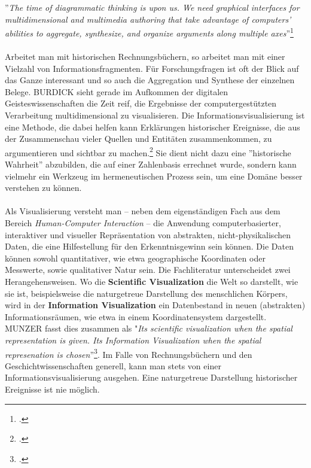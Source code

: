 \documentclass[12pt,a4paper]{article}
\begin{document}
''\textit{The time of diagrammatic thinking is upon us. We need graphical interfaces for multidimensional and multimedia authoring that take advantage of computers’ abilities to aggregate, synthesize, and organize arguments along multiple axes}''\footcite[][S.119]{burdick2012digital_humanities}
\\
\\
Arbeitet man mit historischen Rechnungsbüchern, so arbeitet man mit einer Vielzahl von Informationsfragmenten. Für Forschungsfragen ist oft der Blick auf das Ganze interessant und so auch die Aggregation und Synthese der einzelnen Belege. BURDICK sieht gerade im Aufkommen der digitalen Geisteswissenschaften die Zeit reif, die Ergebnisse der computergestützten Verarbeitung multidimensional zu visualisieren. Die Informationsvisualisierung ist eine Methode, die dabei helfen kann Erklärungen historischer Ereignisse, die aus der Zusammenschau vieler Quellen und Entitäten zusammenkommen, zu argumentieren und sichtbar zu machen.\footcite[][S.3-5]{frank2018visualisierungswerkzeuge} Sie dient nicht dazu eine ''historische Wahrheit'' abzubilden, die auf einer Zahlenbasis errechnet wurde, sondern kann vielmehr ein Werkzeug im hermeneutischen Prozess sein, um eine Domäne besser verstehen zu können.
\\
\\
Als Visualisierung versteht man -- neben dem eigenständigen Fach aus dem Bereich \textit{Human-Computer Interaction} -- die Anwendung computerbasierter, interaktiver und visueller Repräsentation von abstrakten, nicht-physikalischen Daten, die eine Hilfestellung für den Erkenntnisgewinn sein können. Die Daten können sowohl quantitativer, wie etwa geographische Koordinaten oder Messwerte, sowie qualitativer Natur sein. Die Fachliteratur unterscheidet zwei Herangehensweisen. Wo die \textbf{Scientific Visualization} die Welt so darstellt, wie sie ist, beispielsweise die naturgetreue Darstellung des menschlichen Körpers, wird in der \textbf{Information Visualization} ein Datenbestand in neuen (abstrakten) Informationsräumen, wie etwa in einem Koordinatensystem dargestellt. MUNZER fasst dies zusammen als "\textit{Its scientific visualization when the spatial representation is given. Its Information Visualization when the spatial represenation is chosen}''\footcite[][S.134-153)]{munzner2008process}. Im Falle von Rechnungsbüchern und den Geschichtwissenschaften generell, kann man stets von einer Informationsvisualisierung ausgehen. Eine naturgetreue Darstellung historischer Ereignisse ist nie möglich.
\end{document}
